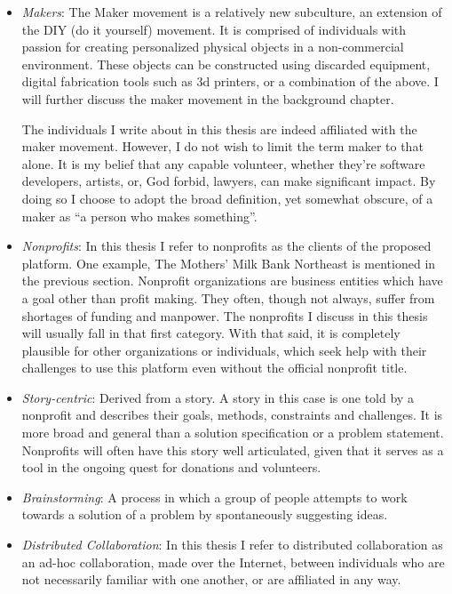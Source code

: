 \begin{itemize}
\item \textit{Makers}:
The Maker movement is a relatively new subculture, an extension of the DIY (do it yourself) movement. It is comprised of individuals with passion for creating personalized physical objects in a non-commercial environment. These objects can be constructed using discarded equipment, digital fabrication tools such as 3d printers, or a combination of the above. I will further discuss the maker movement in the background chapter.

The individuals I write about in this thesis are indeed affiliated with the maker movement. However, I do not wish to limit the term maker to that alone. It is my belief that any capable volunteer, whether they're software developers, artists, or, God forbid, lawyers, can make significant impact. By doing so I choose to adopt the broad definition, yet somewhat obscure, of a maker as ``a person who makes something''. 

\item \textit{Nonprofits}: 
In this thesis I refer to nonprofits as the clients of the proposed platform. One example, The Mothers' Milk Bank Northeast is mentioned in the previous section. Nonprofit organizations are business entities which have a goal other than profit making. They often, though not always, suffer from shortages of funding and manpower. The nonprofits I discuss in this thesis will usually fall in that first category. With that said, it is completely plausible for other organizations or individuals, which seek help with their challenges to use this platform even without the official nonprofit title.

\item \textit{Story-centric}:
Derived from a story. A story in this case is one told by a nonprofit and describes their goals, methods, constraints and challenges. It is more broad and general than a solution specification or a problem statement. Nonprofits will often have this story well articulated, given that it serves as a tool in the ongoing quest for donations and volunteers. 

\item \textit{Brainstorming}:
A process in which a group of people attempts to work towards a solution of a problem by spontaneously suggesting ideas. 

\item \textit{Distributed Collaboration}:
In this thesis I refer to distributed collaboration as an ad-hoc collaboration, made over the Internet, between individuals who are not necessarily familiar with one another, or are affiliated in any way.  

\end{itemize}

